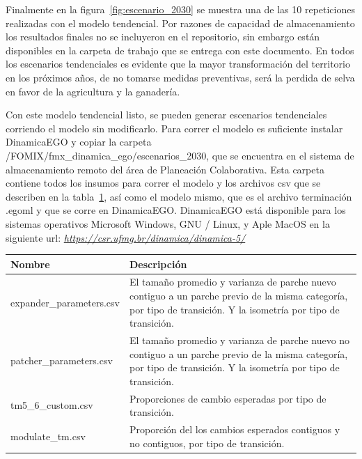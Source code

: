 \documentclass[12pt,a4paper,oldfontcommands]{article}
\begin{document}
Finalmente en la figura~\ref{fig:escenario_2030} se muestra una de las 10 repeticiones realizadas con el modelo tendencial. Por razones de capacidad de almacenamiento los resultados finales no se incluyeron en el repositorio, sin embargo están disponibles en la carpeta de trabajo que se entrega con este documento. En todos los escenarios tendenciales es evidente que la mayor transformación del territorio en los próximos años, de no tomarse medidas preventivas, será la perdida de selva en favor de la agricultura y la ganadería.

Con este modelo tendencial listo, se pueden generar escenarios tendenciales corriendo el modelo sin modificarlo. Para correr el modelo es suficiente instalar DinamicaEGO y copiar la carpeta /FOMIX/fmx\_dinamica\_ego/escenarios\_2030, que se encuentra en el sistema de almacenamiento remoto del área de Planeación Colaborativa. Esta carpeta contiene todos los insumos para correr el modelo y los archivos csv que se describen en la tabla~\ref{jugar}, así como el modelo mismo, que es el archivo terminación .egoml y que se corre en DinamicaEGO. DinamicaEGO está disponible para los sistemas operativos Microsoft Windows, GNU / Linux, y Aple MacOS en la siguiente url: \textit{\url{https://csr.ufmg.br/dinamica/dinamica-5/}}



\bigskip
\begin{table}
\begin{center}	
\label{jugar}
\begin{tabular}{ l p{7cm} }
	Nombr{e} & D{e}scripción \\
	\midrule
	expander\_parameters.csv & El tamaño promedio y varianza de parche nuevo contiguo a un parche previo de la misma categoría, por tipo de transición. Y la isometría por tipo de transición.\\
	patcher\_parameters.csv & El tamaño promedio y varianza de parche nuevo no contiguo a un parche previo de la misma categoría, por tipo de transición. Y la isometría por tipo de transición. \\
	tm5\_6\_custom.csv & Proporciones de cambio esperadas por tipo de transición. \\
	modulate\_tm.csv & Proporción del los cambios esperados contiguos y no contiguos, por tipo de transición. 
\end{tabular}
\end{center} 
\end{table} \\
\end{document}
